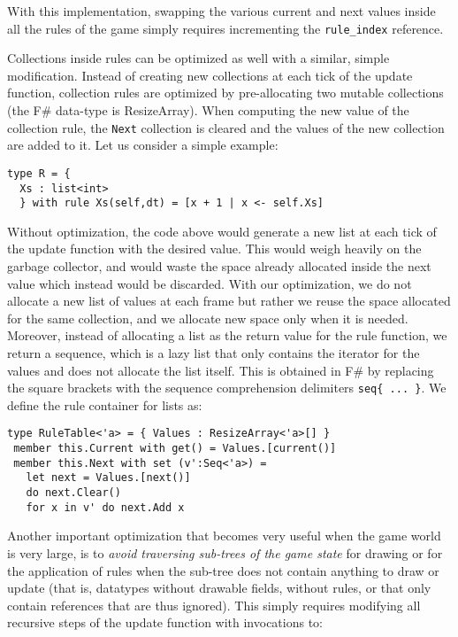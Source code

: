 With this implementation, swapping the various current and next values inside all the rules of the game simply requires incrementing the \texttt{rule\_index} reference. 

Collections inside rules can be optimized as well with a similar, simple modification. Instead of creating new collections at each tick of the update function, collection rules are optimized by pre-allocating two mutable collections (the F\# data-type is ResizeArray). When computing the new value of the collection rule, the \texttt{Next} collection is cleared and the values of the new collection are added to it. Let us consider a simple example:

\begin{lstlisting}
type R = {
  Xs : list<int>
  } with rule Xs(self,dt) = [x + 1 | x <- self.Xs]
\end{lstlisting}

Without optimization, the code above would generate a new list at each tick of the update function with the desired value. This would weigh heavily on the garbage collector, and would waste the space already allocated inside the next value which instead would be discarded. With our optimization, we do not allocate a new list of values at each frame but rather we reuse the space allocated for the same collection, and we allocate new space only when it is needed. Moreover, instead of allocating a list as the return value for the rule function, we return a sequence, which is a lazy list that only contains the iterator for the values and does not allocate the list itself. This is obtained in F\# by replacing the square brackets with the sequence comprehension delimiters \texttt{seq\{ ... \}}. We define the rule container for lists as:

\begin{lstlisting}
type RuleTable<'a> = { Values : ResizeArray<'a>[] }
 member this.Current with get() = Values.[current()]
 member this.Next with set (v':Seq<'a>) =
   let next = Values.[next()]
   do next.Clear()
   for x in v' do next.Add x
\end{lstlisting}

Another important optimization that becomes very useful when the game world is very large, is to \textit{avoid traversing sub-trees of the game state} for drawing or for the application of rules when the sub-tree does not contain anything to draw or update (that is, datatypes without drawable fields, without rules, or that only contain references that are thus ignored). This simply requires modifying all recursive steps of the update function with invocations to:


